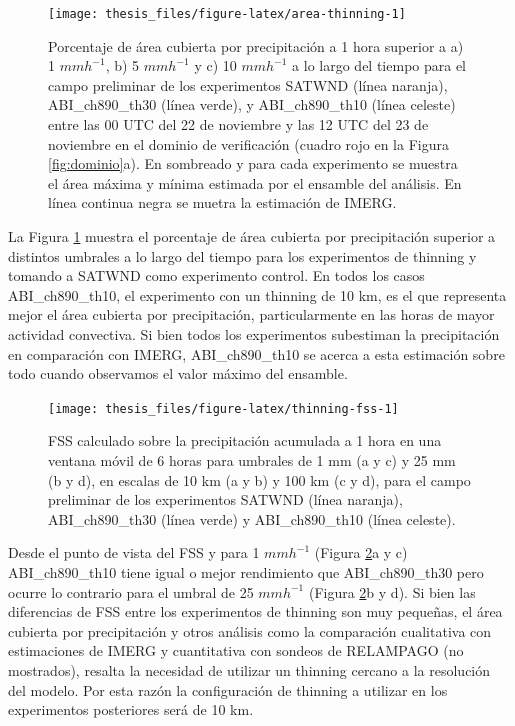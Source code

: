 \documentclass[12pt,oneside,a4paper]{reedthesis}
\begin{document}
\begin{figure}
\texttt{[image: thesis\_files/figure-latex/area-thinning-1]} \caption{Porcentaje de área cubierta por precipitación a 1 hora superior a a) 1 \(mmh^{-1}\), b) 5 \(mmh^{-1}\) y c) 10 \(mmh^{-1}\) a lo largo del tiempo para el campo preliminar de los experimentos SATWND (línea naranja), ABI\_ch890\_th30 (línea verde), y ABI\_ch890\_th10 (línea celeste) entre las 00 UTC del 22 de noviembre y las 12 UTC del 23 de noviembre en el dominio de verificación (cuadro rojo en la Figura \ref{fig:dominio}a). En sombreado y para cada experimento se muestra el área máxima y mínima estimada por el ensamble del análisis. En línea continua negra se muetra la estimación de IMERG.}\label{fig:area-thinning}
\end{figure}
La Figura \ref{fig:area-thinning} muestra el porcentaje de área cubierta por precipitación superior a distintos umbrales a lo largo del tiempo para los experimentos de thinning y tomando a SATWND como experimento control. En todos los casos ABI\_ch890\_th10, el experimento con un thinning de 10 km, es el que representa mejor el área cubierta por precipitación, particularmente en las horas de mayor actividad convectiva. Si bien todos los experimentos subestiman la precipitación en comparación con IMERG, ABI\_ch890\_th10 se acerca a esta estimación sobre todo cuando observamos el valor máximo del ensamble.


\begin{figure}
\texttt{[image: thesis\_files/figure-latex/thinning-fss-1]} \caption{FSS calculado sobre la precipitación acumulada a 1 hora en una ventana móvil de 6 horas para umbrales de 1 mm (a y c) y 25 mm (b y d), en escalas de 10 km (a y b) y 100 km (c y d), para el campo preliminar de los experimentos SATWND (línea naranja), ABI\_ch890\_th30 (línea verde) y ABI\_ch890\_th10 (línea celeste).}\label{fig:thinning-fss}
\end{figure}
Desde el punto de vista del FSS y para 1 \(mm h^{-1}\) (Figura \ref{fig:thinning-fss}a y c) ABI\_ch890\_th10 tiene igual o mejor rendimiento que ABI\_ch890\_th30 pero ocurre lo contrario para el umbral de 25 \(mm h^{-1}\) (Figura \ref{fig:thinning-fss}b y d). Si bien las diferencias de FSS entre los experimentos de thinning son muy pequeñas, el área cubierta por precipitación y otros análisis como la comparación cualitativa con estimaciones de IMERG y cuantitativa con sondeos de RELAMPAGO (no mostrados), resalta la necesidad de utilizar un thinning cercano a la resolución del modelo. Por esta razón la configuración de thinning a utilizar en los experimentos posteriores será de 10 km.
\end{document}
